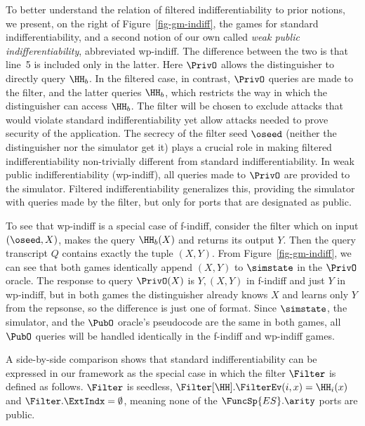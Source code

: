 To better understand the relation of filtered indifferentiability to prior notions, we present, on the right of Figure~\ref{fig-gm-indiff}, the games for standard~\cite{TCC:MauRenHol04} indifferentiability, and a second notion of our own called \textit{weak public indifferentiability}, abbreviated wp-indiff.
The difference between the two is that line~5 is included only in the latter.
Here $\PrivO$ allows the distinguisher to directly query $\HH_b$.
In the filtered case, in contrast, $\PrivO$ queries are made to the filter, and the latter queries $\HH_b$, which restricts the way in which the distinguisher can access $\HH_b$.
The filter will be chosen to exclude attacks that would violate standard indifferentiability yet allow attacks needed to prove security of the application.
The secrecy of the filter seed $\oseed$ (neither the distinguisher nor the simulator get it) plays a crucial role in making filtered indifferentiability non-trivially different from standard indifferentiability.  In weak public indifferentiability (wp-indiff), all queries made to $\PrivO$ are provided to the simulator. Filtered indifferentiability generalizes this, providing the simulator with queries made by the filter, but only for ports that are designated as public.

To see that wp-indiff is a special case of f-indiff, consider the filter which on input $(\oseed, X)$, makes the query $\HH_b(X)$ and returns its output $Y$. Then the query transcript $Q$ contains exactly the tuple $(X,Y)$. From Figure~\ref{fig-gm-indiff}, we can see that both games identically append $(X,Y)$ to $\simstate$ in the $\PrivO$ oracle. The response to query $\PrivO(X)$ is $Y,(X,Y)$ in f-indiff and just $Y$ in wp-indiff, but in both games the distinguisher already knows $X$ and learns only $Y$ from the repsonse, so the difference is just one of format. Since $\simstate$, the simulator, and the $\PubO$ oracle's pseudocode are the same in both games, all $\PubO$ queries will be handled identically in the f-indiff and wp-indiff games.

A side-by-side comparison shows that standard indifferentiability can be expressed in our framework as the special case in which the filter $\Filter$ is defined as follows.
$\Filter$ is seedless, $\Filter[\HH].\FilterEv(i,x) = \HH_i(x)$ and $\Filter.\ExtIndx =  \emptyset$, meaning none of the $\FuncSp{ES}.\arity$ ports are public.

